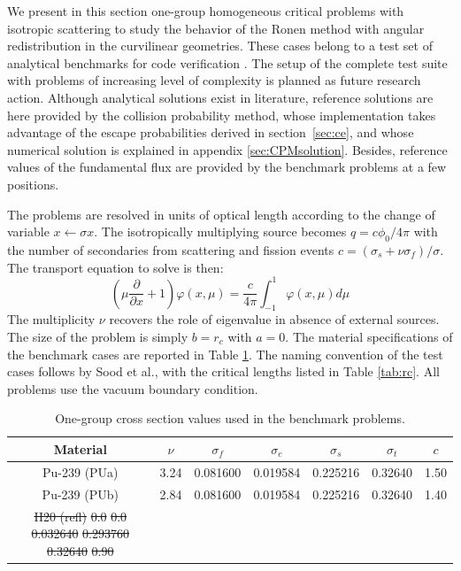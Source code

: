 \documentclass{ictt26}
\providecommand{\DIFadd}[1]{{\protect\color{blue}\uwave{#1}}} %
\providecommand{\DIFdel}[1]{{\protect\color{red}\sout{#1}}}                      %
\providecommand{\DIFaddbegin}{} %
\providecommand{\DIFaddend}{} %
\providecommand{\DIFdelbegin}{} %
\providecommand{\DIFdelend}{} %
\providecommand{\DIFdelFL}[1]{\DIFdel{#1}} %
\providecommand{\DIFdelbeginFL}{} %
\providecommand{\DIFdelendFL}{} %
\newcommand{\DIFscaledelfig}{0.5}
\newlength{\DIFdelgraphicswidth} %
\newlength{\DIFdelgraphicsheight} %
\newcommand{\DIFaddincludegraphics}[2][]{{\color{blue}\fbox{\DIFOincludegraphics[#1]{#2}}}} %
\newcommand{\DIFdelincludegraphics}[2][]{%
\sbox{\DIFdelgraphicsbox}{\DIFOincludegraphics[#1]{#2}}%
\settoboxwidth{\DIFdelgraphicswidth}{\DIFdelgraphicsbox} %
\settoboxtotalheight{\DIFdelgraphicsheight}{\DIFdelgraphicsbox} %
\scalebox{\DIFscaledelfig}{%
\parbox[b]{\DIFdelgraphicswidth}{\usebox{\DIFdelgraphicsbox}\\[-\baselineskip] \rule{\DIFdelgraphicswidth}{0em}}\llap{\resizebox{\DIFdelgraphicswidth}{\DIFdelgraphicsheight}{%
\setlength{\unitlength}{\DIFdelgraphicswidth}%
\begin{picture}(1,1)%
\thicklines\linethickness{2pt} %
{\color[rgb]{1,0,0}\put(0,0){\framebox(1,1){}}}%
{\color[rgb]{1,0,0}\put(0,0){\line( 1,1){1}}}%
{\color[rgb]{1,0,0}\put(0,1){\line(1,-1){1}}}%
\end{picture}%
}\hspace*{3pt}}} %
} %
\DeclareRobustCommand{\DIFaddbegin}{\DIFOaddbegin \let\includegraphics\DIFaddincludegraphics} %
\DeclareRobustCommand{\DIFaddend}{\DIFOaddend \let\includegraphics\DIFOincludegraphics} %
\DeclareRobustCommand{\DIFdelbegin}{\DIFOdelbegin \let\includegraphics\DIFdelincludegraphics} %
\DeclareRobustCommand{\DIFdelend}{\DIFOaddend \let\includegraphics\DIFOincludegraphics} %
\DeclareRobustCommand{\DIFdelbeginFL}{\DIFOdelbeginFL \let\includegraphics\DIFdelincludegraphics} %
\DeclareRobustCommand{\DIFdelendFL}{\DIFOaddendFL \let\includegraphics\DIFOincludegraphics} %
\begin{document}
We present in this section one-group homogeneous critical problems with isotropic scattering to study the behavior of the Ronen method with angular redistribution in the curvilinear geometries. These cases belong to a test set of analytical benchmarks for code verification \cite{sood2003analytical}. The setup of the complete test suite with problems of increasing level of complexity is planned as future research action. Although analytical solutions exist in literature, reference solutions are here provided by the collision probability method, whose implementation takes advantage of the escape probabilities derived in section~\ref{sec:ce}, and whose numerical solution is explained in appendix \ref{sec:CPMsolution}. Besides, reference values of the fundamental flux are provided by the benchmark problems at a few positions.

The problems are resolved in units of optical length according to the change of variable $x \leftarrow \sigma x$. The isotropically multiplying source becomes \DIFdelbegin \DIFdel{$q = c \phi_0 / 4\pi$ }\DIFdelend \DIFaddbegin \DIFadd{$q = c \varphi_0 / 4\pi$ }\DIFaddend with the number of secondaries from scattering and fission events $c = (\sigma_s + \nu \sigma_f)/\sigma$. The transport equation to solve is then:
\[
\left( \mu \frac{\partial}{\partial x} + 1\right) \varphi(x,\mu)
 = \frac{c}{4 \pi}\int_{-1}^{1}{\varphi(x,\mu) d\mu}
\]
The multiplicity $\nu$ recovers the role of eigenvalue in absence of external sources. The size of the problem is simply $b=r_c$ with $a=0$. %
The material specifications of the benchmark cases are reported in Table \ref{tab:xs}. The naming convention of the test cases follows by Sood et al., with the critical lengths listed in Table \ref{tab:rc}. All problems use the vacuum boundary condition. %

\begin{table}[htb]
\centering
\caption{One-group cross section values used in the benchmark problems.}\label{tab:xs}
\begin{tabular}{c|*{6}{l}}
Material & \multicolumn{1}{c}{$\nu$} & \multicolumn{1}{c}{$\sigma_f$} & \multicolumn{1}{c}{$\sigma_c$} & \multicolumn{1}{c}{$\sigma_s$} & \multicolumn{1}{c}{$\sigma_t$} & \multicolumn{1}{c}{$c$}\\ \hline
Pu-239 (PUa)& 3.24 & 0.081600 & 0.019584 & 0.225216 & 0.32640 & 1.50\\
Pu-239 (PUb)& 2.84 & 0.081600 & 0.019584 & 0.225216 & 0.32640 & 1.40\\
\DIFdelbeginFL \DIFdelFL{H20 (refl)}%
\DIFdelFL{0.0 }%
\DIFdelFL{0.0 }%
\DIFdelFL{0.032640 }%
\DIFdelFL{0.293760 }%
\DIFdelFL{0.32640 }%
\DIFdelFL{0.90}%
\DIFdelendFL %
\end{tabular}
\end{table}
\end{document}
